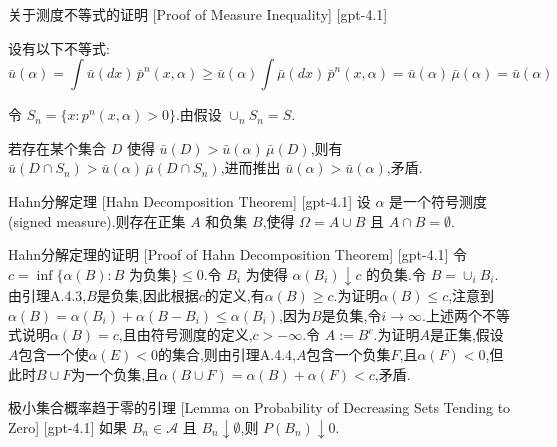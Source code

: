 \documentclass[UTF8]{ctexart}
\begin{document}
    
    
    \begin{prf}
        {关于测度不等式的证明}
        [Proof of Measure Inequality]
        [gpt-4.1]
        
设有以下不等式:
\[
\bar{
u}(\alpha) = \int \bar{
u}(dx)\, \bar{p}^n(x, \alpha) \geq \bar{
u}(\alpha) \int \bar{\mu}(dx)\, \bar{p}^n(x, \alpha) = \bar{
u}(\alpha)\, \bar{\mu}(\alpha) = \bar{
u}(\alpha)
\]

令 $S_n = \{ x : p^n(x, \alpha) > 0 \}$.由假设 $\cup_n S_n = S$.

若存在某个集合 $D$ 使得 $\bar{
u}(D) > \bar{
u}(\alpha)\, \bar{\mu}(D)$,则有 $\bar{
u}(D \cap S_n) > \bar{
u}(\alpha)\, \bar{\mu}(D \cap S_n)$,进而推出 $\bar{
u}(\alpha) > \bar{
u}(\alpha)$,矛盾.

    \end{prf}
    
    
    
    \begin{thm}
        {Hahn分解定理}
        [Hahn Decomposition Theorem]
        [gpt-4.1]
        设 $\alpha$ 是一个符号测度(signed measure).则存在正集 $A$ 和负集 $B$,使得 $\Omega = A \cup B$ 且 $A \cap B = \emptyset$.
    \end{thm}
    
    
    
    \begin{prf}
        {Hahn分解定理的证明}
        [Proof of Hahn Decomposition Theorem]
        [gpt-4.1]
        令 $c = \inf\{ \alpha(B) : B \text{ 为负集} \} \leq 0$.令 $B_i$ 为使得 $\alpha(B_i) \downarrow c$ 的负集.令 $B = \cup_i B_i$.由引理A.4.3,$B$是负集,因此根据$c$的定义,有$\alpha(B) \geq c$.为证明$\alpha(B) \leq c$,注意到$\alpha(B) = \alpha(B_i) + \alpha(B - B_i) \leq \alpha(B_i)$,因为$B$是负集,令$i \to \infty$.上述两个不等式说明$\alpha(B) = c$,且由符号测度的定义,$c > -\infty$.令 $A := B^c$.为证明$A$是正集,假设$A$包含一个使$\alpha(E) < 0$的集合,则由引理A.4.4,$A$包含一个负集$F$,且$\alpha(F) < 0$,但此时$B \cup F$为一个负集,且$\alpha(B \cup F) = \alpha(B) + \alpha(F) < c$,矛盾.
    \end{prf}
    
    
    
    \begin{lma}
        {极小集合概率趋于零的引理}
        [Lemma on Probability of Decreasing Sets Tending to Zero]
        [gpt-4.1]
        如果 $B_n \in \mathcal{A}$ 且 $B_n \downarrow \emptyset$,则 $P(B_n) \downarrow 0$.
    \end{lma}
    
\end{document}

